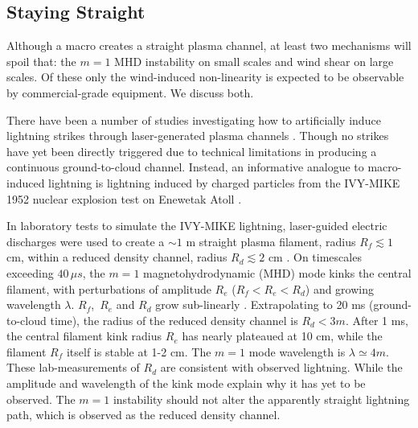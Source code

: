 \documentclass[%
 reprint,
 amsmath,amssymb,
 aps,
]{revtex4-2}
\begin{document}


    \subsection{Staying Straight} %
    \label{sub:staying_straight}

        Although a macro creates a straight plasma channel, at least two mechanisms will spoil that: the $m=1$ MHD instability on small scales and wind shear on large scales. Of these only the wind-induced non-linearity is expected to be observable by commercial-grade equipment. We discuss both.

        There have been a number of studies investigating how to artificially induce lightning strikes through laser-generated plasma channels \citep[see][]{Kasparian2008}. Though no strikes have yet been directly triggered due to technical limitations in producing a continuous ground-to-cloud channel. Instead, an informative analogue to macro-induced lightning is lightning induced by charged particles from the IVY-MIKE 1952 nuclear explosion test on Enewetak Atoll \citep{IVY-MIKE1987}. 

        In laboratory tests to simulate the IVY-MIKE lightning, laser-guided electric discharges were used to create a ${\sim 1}$ m straight plasma filament, radius $R_f\lesssim 1$ cm, within a reduced density channel, radius $R_d \lesssim 2$ cm \citep[][fig. 6]{IVY-MIKE1987}. On timescales exceeding $40 \, \mu s$, the $m=1$ magnetohydrodynamic (MHD) mode kinks the central filament, with perturbations of amplitude $R_e$ ($R_f < R_e < R_d$) and growing wavelength $\lambda$. $R_f$,\, $R_e$ and $R_d$ grow sub-linearly \citep[][fig. 9]{IVY-MIKE1987}. Extrapolating to 20 ms (ground-to-cloud time), the radius of the reduced density channel is $R_d<3m$. After 1 ms, the central filament kink radius $R_e$ has nearly plateaued at 10 cm, while the filament $R_f$ itself is stable at 1-2 cm. The $m=1$ mode wavelength is $\lambda\simeq4 m$. These lab-measurements of $R_d$ are consistent with observed lightning. While the amplitude and wavelength of the kink mode explain why it has yet to be observed. The $m=1$ instability should not alter the apparently straight lightning path, which is observed as the reduced density channel.
\end{document}
